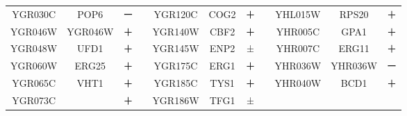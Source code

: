 \documentclass[a4paper,papersize,dvipdfmx]{jsarticle}
\begin{document}
\begin{table}[H]
\begin{tabular}{|c|c|c|c|c|c|c|cccc}
YGR030C & POP6    & ー   &  & YGR120C & COG2  & ＋   & \multicolumn{1}{c|}{} & \multicolumn{1}{c|}{YHL015W} & \multicolumn{1}{c|}{RPS20}   & \multicolumn{1}{c|}{＋}   \\ \cline{1-3} \cline{5-7} \cline{9-11}
YGR046W & YGR046W & ＋   &  & YGR140W & CBF2  & ＋   & \multicolumn{1}{c|}{} & \multicolumn{1}{c|}{YHR005C} & \multicolumn{1}{c|}{GPA1}    & \multicolumn{1}{c|}{＋}   \\ \cline{1-3} \cline{5-7} \cline{9-11}
YGR048W & UFD1    & ＋   &  & YGR145W & ENP2  & ±   & \multicolumn{1}{c|}{} & \multicolumn{1}{c|}{YHR007C} & \multicolumn{1}{c|}{ERG11}   & \multicolumn{1}{c|}{＋}   \\ \cline{1-3} \cline{5-7} \cline{9-11}
YGR060W & ERG25   & ＋   &  & YGR175C & ERG1  & ＋   & \multicolumn{1}{c|}{} & \multicolumn{1}{c|}{YHR036W} & \multicolumn{1}{c|}{YHR036W} & \multicolumn{1}{c|}{ー}   \\ \cline{1-3} \cline{5-7} \cline{9-11}
YGR065C & VHT1    & ＋   &  & YGR185C & TYS1  & ＋   & \multicolumn{1}{c|}{} & \multicolumn{1}{c|}{YHR040W} & \multicolumn{1}{c|}{BCD1}    & \multicolumn{1}{c|}{＋}   \\ \cline{1-3} \cline{5-7} \cline{9-11}
YGR073C &         & ＋   &  & YGR186W & TFG1  & ±   &                       &                              &                              &                          \\ \cline{1-3} \cline{5-7}
\end{tabular}
\end{table}
\end{document}
